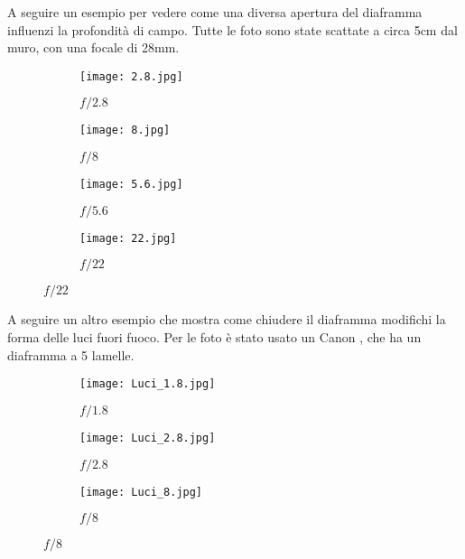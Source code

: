 A seguire un esempio per vedere come una diversa apertura del diaframma influenzi la profondità di campo. Tutte le foto sono state scattate a circa 5cm dal muro, con una focale di 28mm.

\begin{figure}[!ht]
    \centering
        \begin{subfigure}{0.45\linewidth}
            \texttt{[image: 2.8.jpg]}
            \caption{$f/2.8$}
        \end{subfigure}
    \hfil
        \begin{subfigure}{0.45\linewidth}
            \texttt{[image: 8.jpg]}
            \caption{$f/8$}
        \end{subfigure}
    
        \begin{subfigure}{0.45\linewidth}
            \texttt{[image: 5.6.jpg]}
            \caption{$f/5.6$}
        \end{subfigure}
    \hfil
        \begin{subfigure}{0.45\linewidth}
            \texttt{[image: 22.jpg]}
            \caption{$f/22$}
        \end{subfigure}
    
    \label{fig:diaframmadof}
\end{figure}

A seguire un altro esempio che mostra come chiudere il diaframma modifichi la forma delle luci fuori fuoco. Per le foto è stato usato un Canon , che ha un diaframma a 5 lamelle.
\begin{figure}[H]
    \centering
        \begin{subfigure}{0.30\linewidth}
            \texttt{[image: Luci\_1.8.jpg]}
            \caption{$f/1.8$}
        \end{subfigure}
        \begin{subfigure}{0.30\linewidth}
            \texttt{[image: Luci\_2.8.jpg]}
            \caption{$f/2.8$}
        \end{subfigure}
    
        \begin{subfigure}{0.30\linewidth}
            \texttt{[image: Luci\_8.jpg]}
            \caption{$f/8$}
        \end{subfigure}

    \label{fig:diaframmaluci}
\end{figure}


